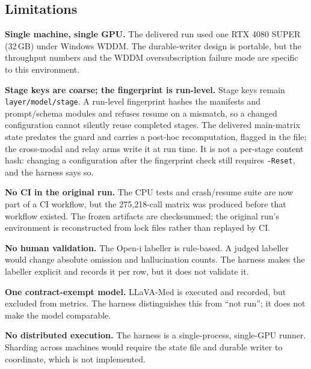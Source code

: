 \subsection{Limitations}

\textbf{Single machine, single GPU.} The delivered run used one RTX 4080 SUPER (32\,GB) under Windows WDDM. The durable-writer design is portable, but the throughput numbers and the WDDM oversubscription failure mode are specific to this environment.

\textbf{Stage keys are coarse; the fingerprint is run-level.} Stage keys remain \texttt{layer/model/stage}. A run-level fingerprint hashes the manifests and prompt/schema modules and refuses resume on a mismatch, so a changed configuration cannot silently reuse completed stages. The delivered main-matrix state predates the guard and carries a post-hoc recomputation, flagged in the file; the cross-modal and relay arms write it at run time. It is not a per-stage content hash: changing a configuration after the fingerprint check still requires \texttt{-Reset}, and the harness says so.

\textbf{No CI in the original run.} The CPU tests and crash/resume suite are now part of a CI workflow, but the 275,218-call matrix was produced before that workflow existed. The frozen artifacts are checksummed; the original run's environment is reconstructed from lock files rather than replayed by CI.

\textbf{No human validation.} The Open-i labeller is rule-based. A judged labeller would change absolute omission and hallucination counts. The harness makes the labeller explicit and records it per row, but it does not validate it.

\textbf{One contract-exempt model.} LLaVA-Med is executed and recorded, but excluded from metrics. The harness distinguishes this from ``not run''; it does not make the model comparable.

\textbf{No distributed execution.} The harness is a single-process, single-GPU runner. Sharding across machines would require the state file and durable writer to coordinate, which is not implemented.
